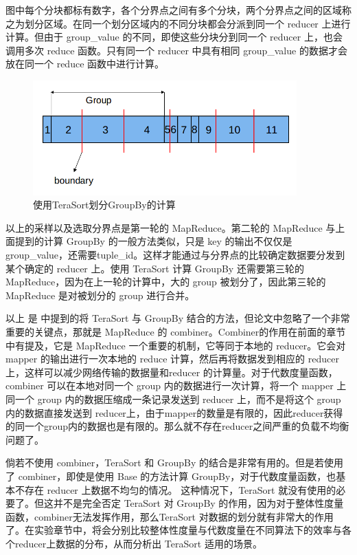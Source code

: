 图中每个分块都标有数字，各个分界点之间有多个分块，两个分界点之间的区域称之为划分区域。在同一个划分区域内的不同分块都会分派到同一个 reducer 上进行计算。但由于 group\_value 的不同，即使这些分块分到同一个 reducer 上，也会调用多次 reduce 函数。只有同一个 reducer 中具有相同 group\_value 的数据才会放在同一个 reduce 函数中进行计算。

\begin{figure}[!ht] 
\centering\includegraphics[width=4in]{picture/ch_terasort_mr/ts_groupby} 
\caption{使用TeraSort划分GroupBy的计算}\label{ts_groupby} 
\end{figure}

以上的采样以及选取分界点是第一轮的 MapReduce。第二轮的 MapReduce 与上面提到的计算 GroupBy 的一般方法类似，只是 key 的输出不仅仅是 group\_value，还需要tuple\_id。这样才能通过与分界点的比较确定数据要分发到某个确定的 reducer 上。使用 TeraSort 计算 GroupBy 还需要第三轮的 MapReduce，因为在上一轮的计算中，大的 group 被划分了，因此第三轮的 MapReduce 是对被划分的 group 进行合并。

以上 是 \cite{tao2013minimal} 中提到的将 TeraSort 与 GroupBy 结合的方法，但论文中忽略了一个非常重要的关键点，那就是 MapReduce 的 combiner。Combiner的作用在前面的章节中有提及，它是 MapReduce 一个重要的机制，它等同于本地的 reducer。它会对 mapper 的输出进行一次本地的 reduce 计算，然后再将数据发到相应的 reducer 上，这样可以减少网络传输的数据量和reducer 的计算量。对于代数度量函数，combiner 可以在本地对同一个 group 内的数据进行一次计算，将一个 mapper 上同一个 group 内的数据压缩成一条记录发送到 reducer 上，而不是将这个 group 内的数据直接发送到 reducer上，由于mapper的数量是有限的，因此reducer获得的同一个group内的数据也是有限的。那么就不存在reducer之间严重的负载不均衡问题了。

倘若不使用 combiner，TeraSort 和 GroupBy 的结合是非常有用的。但是若使用了 combiner，即使是使用 Base 的方法计算 GroupBy，对于代数度量函数，也基本不存在 reducer 上数据不均匀的情况。 这种情况下，TeraSort 就没有使用的必要了。但这并不是完全否定 TeraSort 对 GroupBy 的作用，因为对于整体性度量函数，combiner无法发挥作用，那么TeraSort 对数据的划分就有非常大的作用了。在实验章节中，将会分别比较整体性度量与代数度量在不同算法下的效率与各个reducer上数据的分布，从而分析出 TeraSort 适用的场景。


